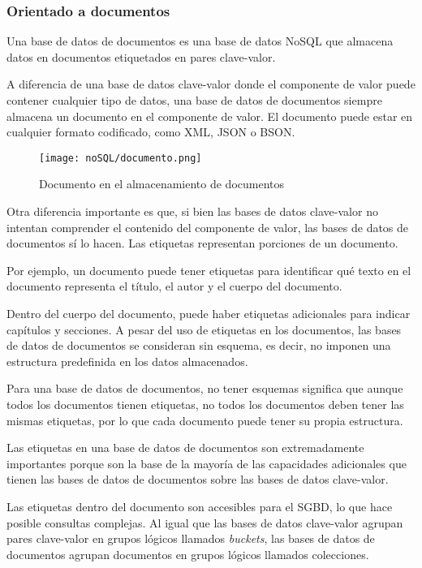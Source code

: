 \subsubsection{Orientado a documentos}
Una base de datos de documentos es una base de datos NoSQL que almacena datos en documentos etiquetados en pares clave-valor.


A diferencia de una base de datos clave-valor donde el componente de valor puede contener cualquier tipo de datos, una base de datos de documentos siempre almacena un documento en el componente de valor. El documento puede estar en cualquier formato codificado, como XML, JSON o BSON.


\begin{figure}[H]
    \centering
    \texttt{[image: noSQL/documento.png]}
    \caption{Documento en el almacenamiento de documentos}
    \label{img:documentos-documento}
\end{figure}
Otra diferencia importante es que, si bien las bases de datos clave-valor no intentan comprender el contenido del componente de valor, las bases de datos de documentos sí lo hacen. Las etiquetas representan porciones de un documento.


Por ejemplo, un documento puede tener etiquetas para identificar qué texto en el documento representa el título, el autor y el cuerpo del documento.


Dentro del cuerpo del documento, puede haber etiquetas adicionales para indicar capítulos y secciones. A pesar del uso de etiquetas en los documentos, las bases de datos de documentos se consideran sin esquema, es decir, no imponen una estructura predefinida en los datos almacenados.


Para una base de datos de documentos, no tener esquemas significa que aunque todos los documentos tienen etiquetas, no todos los documentos deben tener las mismas etiquetas, por lo que cada documento puede tener su propia estructura.


Las etiquetas en una base de datos de documentos son extremadamente importantes porque son la base de la mayoría de las capacidades adicionales que tienen las bases de datos de documentos sobre las bases de datos clave-valor.


Las etiquetas dentro del documento son accesibles para el SGBD, lo que hace posible consultas complejas. Al igual que las bases de datos clave-valor agrupan pares clave-valor en grupos lógicos llamados \textit{buckets}, las bases de datos de documentos agrupan documentos en grupos lógicos llamados colecciones.


